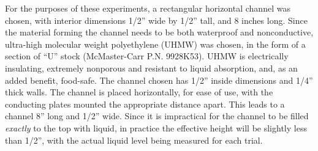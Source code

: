 \documentclass[]{article}
\begin{document}
\par For the purposes of these experiments, a rectangular horizontal channel was chosen, with interior dimensions 1/2'' wide by 1/2'' tall, and 8 inches long. Since the material forming the channel needs to be both waterproof and nonconductive,  ultra-high molecular weight polyethylene (UHMW) was chosen, in the form of a section of ``U'' stock (McMaster-Carr P.N. 9928K53). UHMW is electrically insulating, extremely nonporous and resistant to liquid absorption, and, as an added benefit, food-safe. The channel chosen has 1/2'' inside dimensions and 1/4'' thick walls. The channel is placed horizontally, for ease of use, with the conducting plates mounted the appropriate distance apart. This leads to a channel 8'' long and 1/2'' wide. Since it is impractical for the channel to be filled \textit{exactly} to the top with liquid, in practice the effective height will be slightly less than 1/2'', with the actual liquid level being measured for each trial.
\end{document}
